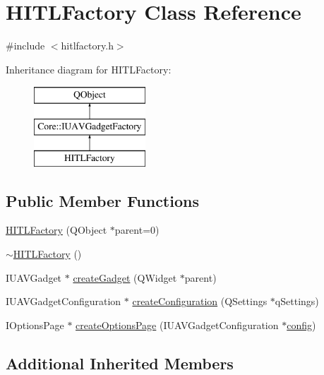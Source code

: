 \hypertarget{class_h_i_t_l_factory}{\section{H\-I\-T\-L\-Factory Class Reference}
\label{class_h_i_t_l_factory}
}


{\ttfamily \#include $<$hitlfactory.\-h$>$}

Inheritance diagram for H\-I\-T\-L\-Factory\-:\begin{figure}[H]
\begin{center}
\leavevmode
\includegraphics[height=3.000000cm]{class_h_i_t_l_factory}
\end{center}
\end{figure}
\subsection*{Public Member Functions}
\begin{DoxyCompactItemize}
\item 
\hyperlink{group___h_i_t_l_plugin_ga855bda20fa1058c99d4d1aa499fe694e}{H\-I\-T\-L\-Factory} (Q\-Object $\ast$parent=0)
\item 
\hyperlink{group___h_i_t_l_plugin_ga823205c59cff49942e94bc11bb2c4050}{$\sim$\-H\-I\-T\-L\-Factory} ()
\item 
I\-U\-A\-V\-Gadget $\ast$ \hyperlink{group___h_i_t_l_plugin_ga9a06cbbd0b0cd343e48b0386f1ebe45e}{create\-Gadget} (Q\-Widget $\ast$parent)
\item 
I\-U\-A\-V\-Gadget\-Configuration $\ast$ \hyperlink{group___h_i_t_l_plugin_ga68fed3efae6281089db53d6ea596e331}{create\-Configuration} (Q\-Settings $\ast$q\-Settings)
\item 
I\-Options\-Page $\ast$ \hyperlink{group___h_i_t_l_plugin_ga3064ddee76385734787a3a04e203bac2}{create\-Options\-Page} (I\-U\-A\-V\-Gadget\-Configuration $\ast$\hyperlink{deflate_8c_a4473b5227787415097004fd39f55185e}{config})
\end{DoxyCompactItemize}
\subsection*{Additional Inherited Members}


